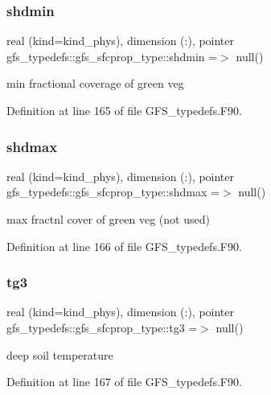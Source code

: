 \subsubsection{shdmin}
{\footnotesize\ttfamily real (kind=kind\+\_\+phys), dimension (\+:), pointer gfs\+\_\+typedefs\+::gfs\+\_\+sfcprop\+\_\+type\+::shdmin =$>$ null()}



min fractional coverage of green veg 



Definition at line 165 of file G\+F\+S\+\_\+typedefs.\+F90.

\mbox{\label{structgfs__typedefs_1_1gfs__sfcprop__type_a229e3a7bcfb3503a4abc95e05baae6b1}} 
\subsubsection{shdmax}
{\footnotesize\ttfamily real (kind=kind\+\_\+phys), dimension (\+:), pointer gfs\+\_\+typedefs\+::gfs\+\_\+sfcprop\+\_\+type\+::shdmax =$>$ null()}



max fractnl cover of green veg (not used) 



Definition at line 166 of file G\+F\+S\+\_\+typedefs.\+F90.

\mbox{\label{structgfs__typedefs_1_1gfs__sfcprop__type_a63dbdc75f8c49cf35e18e739ea0bcdf5}} 
\subsubsection{tg3}
{\footnotesize\ttfamily real (kind=kind\+\_\+phys), dimension    (\+:), pointer gfs\+\_\+typedefs\+::gfs\+\_\+sfcprop\+\_\+type\+::tg3 =$>$ null()}



deep soil temperature 



Definition at line 167 of file G\+F\+S\+\_\+typedefs.\+F90.

\mbox{\label{structgfs__typedefs_1_1gfs__sfcprop__type_a2b730e74e884b3c064c1e691ce4f234c}} 
